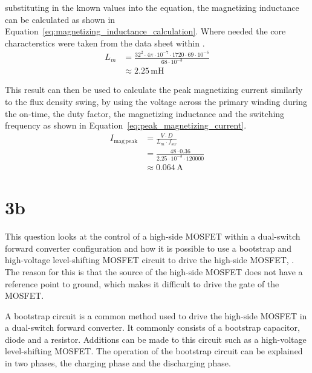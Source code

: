\documentclass[a4paper, 12pt, titlepage]{report}
\begin{document}
substituting in the known values into the equation, the magnetizing inductance can be calculated as shown in Equation~\ref{eq:magnetizing_inductance_calculation}. Where needed the core characterstics were taken from the data sheet within \cite{EE466CourseworkPart2}.
\begin{equation}
    \begin{split}
        L_m &= \frac{32^2 \cdot 4\pi \cdot 10^{-7} \cdot 1720 \cdot 69\cdot 10^{-6}}{68\cdot 10^{-3}} \\
        &\approx 2.25\,\mathrm{mH}
    \end{split}
    \label{eq:magnetizing_inductance_calculation}
\end{equation}

This result can then be used to calculate the peak magnetizing current similarly to the flux density swing, by using the voltage across the primary winding during the on-time, the duty factor, the magnetizing inductance and the switching frequency as shown in Equation~\ref{eq:peak_magnetizing_current}.
\begin{equation}
    \begin{split}
        I_{\mathrm{mag\,peak}} &= \frac{V \cdot D}{L_m \cdot f_{sw}} \\
        &= \frac{48 \cdot 0.36}{2.25\cdot 10^{-3} \cdot 120000} \\
        &\approx 0.064\,\mathrm{A}
    \end{split}
    \label{eq:peak_magnetizing_current}
\end{equation}
\section{3b}
This question looks at the control of a high-side MOSFET within a dual-switch forward converter configuration and how it is possible to use a bootstrap and high-voltage level-shifting MOSFET circuit to drive the high-side MOSFET, \cite{BootstrapCircuit}. The reason for this is that the source of the high-side MOSFET does not have a reference point to ground, which makes it difficult to drive the gate of the MOSFET.

A bootstrap circuit is a common method used to drive the high-side MOSFET in a dual-switch forward converter. It commonly consists of a bootstrap capacitor, diode and a resistor. Additions can be made to this circuit such as a high-voltage level-shifting MOSFET. The operation of the bootstrap circuit can be explained in two phases, the charging phase and the discharging phase.
\end{document}
